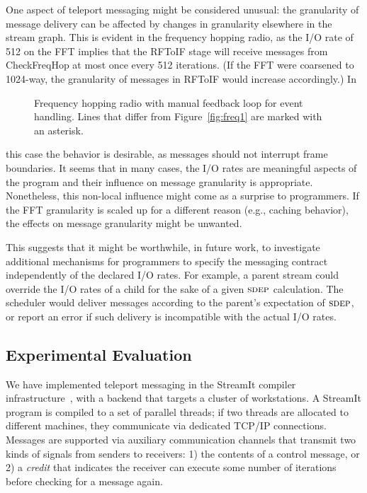 One aspect of teleport messaging might be considered unusual: the
granularity of message delivery can be affected by changes in
granularity elsewhere in the stream graph.  This is evident in the
frequency hopping radio, as the I/O rate of 512 on the FFT implies
that the RFToIF stage will receive messages from CheckFreqHop at most
once every 512 iterations.  (If the FFT were coarsened to 1024-way,
the granularity of messages in RFToIF would increase accordingly.)  In
%
\begin{figure}[t]
\centering
\vspace{-26pt}
\hspace{-0.2in}
\vspace{-10pt}
\caption[Code for frequency hopping radio with manual control
  messages]{Frequency hopping radio with manual feedback loop
  for event handling.  Lines that differ from Figure~\ref{fig:freq1}
  are marked with an asterisk. \protect\label{fig:freq2}}
\vspace{-12pt}
\end{figure}
\clearpage
%
\noindent this case the behavior is desirable, as messages should not
interrupt frame boundaries.  It seems that in many cases, the I/O
rates are meaningful aspects of the program and their influence on
message granularity is appropriate.  Nonetheless, this non-local
influence might come as a surprise to programmers.  If the FFT
granularity is scaled up for a different reason (e.g., caching
behavior), the effects on message granularity might be unwanted.

This suggests that it might be worthwhile, in future work, to
investigate additional mechanisms for programmers to specify the
messaging contract independently of the declared I/O rates.  For
example, a parent stream could override the I/O rates of a child for
the sake of a given $\textsc{sdep}$ calculation.  The scheduler would deliver
messages according to the parent's expectation of $\textsc{sdep}$, or report
an error if such delivery is incompatible with the actual I/O rates.

\subsection*{Experimental Evaluation}
\label{sec:evaluation}

We have implemented teleport messaging in the StreamIt compiler
infrastructure~\cite{streamit-asplos}, with a backend that targets a
cluster of workstations.  A StreamIt program is compiled to a set of
parallel threads; if two threads are allocated to different machines,
they communicate via dedicated TCP/IP connections.  Messages are
supported via auxiliary communication channels that transmit two kinds
of signals from senders to receivers: 1) the contents of a control
message, or 2) a {\it credit} that indicates the receiver can execute
some number of iterations before checking for a message again.

